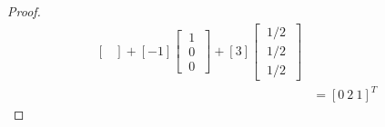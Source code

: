\documentclass[../main.tex]{subfiles}
\begin{document}
\begin{proof}
\begin{align*}
\begin{bmatrix}
                \end{bmatrix} +
                [-1] \begin{bmatrix}
                        \ 1 \ \\
                        \ 0 \ \\
                        \ 0 \
                \end{bmatrix} +
                [3]\begin{bmatrix}
                        \ {1}/{2} \ \\
                        \ {1}/{2} \ \\
                        \ {1}/{2} \
                \end{bmatrix}                 \\
                 & = [0 \ 2 \ 1]^T
        \end{align*}
\end{proof}
\end{document}
